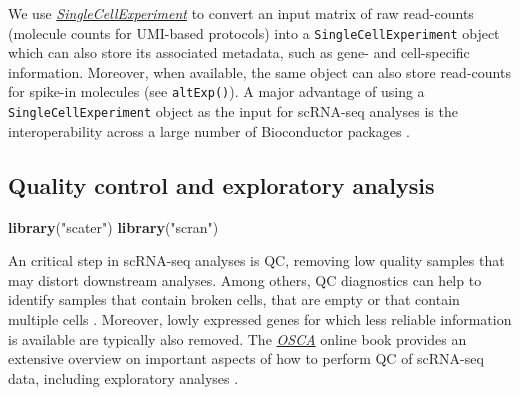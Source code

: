 \documentclass[9pt,a4paper,]{extarticle}
\newenvironment{Shaded}{\begin{snugshade}}{\end{snugshade}}
\newcommand{\KeywordTok}[1]{\textcolor[rgb]{0.13,0.29,0.53}{\textbf{#1}}}
\newcommand{\NormalTok}[1]{#1}
\newcommand{\StringTok}[1]{\textcolor[rgb]{0.31,0.60,0.02}{#1}}
\begin{document}
We use \emph{\href{https://bioconductor.org/packages/3.11/SingleCellExperiment}{SingleCellExperiment}} to convert an input
matrix of raw read-counts (molecule counts for UMI-based protocols) into a
\texttt{SingleCellExperiment} object which can also store its associated
metadata, such as gene- and cell-specific information.
Moreover, when available, the same object can also store read-counts for
spike-in molecules (see \texttt{altExp()}).
A major advantage of using a \texttt{SingleCellExperiment} object as the input for
scRNA-seq analyses is the interoperability across a large number of
Bioconductor packages \citep{Amezquita2019}.

\hypertarget{quality-control-and-exploratory-analysis}{%
\subsection{Quality control and exploratory analysis}\label{quality-control-and-exploratory-analysis}}

\begin{Shaded}
\begin{Highlighting}[]
\KeywordTok{library}\NormalTok{(}\StringTok{"scater"}\NormalTok{)}
\KeywordTok{library}\NormalTok{(}\StringTok{"scran"}\NormalTok{)}
\end{Highlighting}
\end{Shaded}

An critical step in scRNA-seq analyses is QC, removing low quality samples that
may distort downstream analyses.
Among others, QC diagnostics can help to identify samples that contain broken
cells, that are empty or that contain multiple cells \citep{Ilicic2016}.
Moreover, lowly expressed genes for which less reliable information is
available are typically also removed.
The \href{https://osca.bioconductor.org/}{\emph{OSCA}} online book provides an extensive
overview on important aspects of how to perform QC of scRNA-seq data, including
exploratory analyses \citep{Amezquita2019}.
\end{document}
